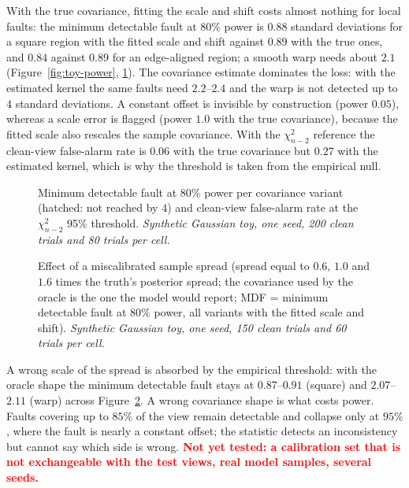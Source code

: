 With the true covariance, fitting the scale and shift costs almost nothing for local faults: the minimum detectable fault at 80\% power is $0.88$ standard
deviations for a square region with the fitted scale and shift against $0.89$ with the true ones, and $0.84$ against $0.89$ for an edge-aligned region; a smooth
warp needs about $2.1$ (Figure~\ref{fig:toy-power}, \ref{fig:toy-mdf}). The covariance estimate dominates the loss: with the estimated kernel the same faults need
$2.2$--$2.4$ and the warp is not detected up to $4$ standard deviations. A constant offset is invisible by construction (power $0.05$), whereas a scale error is
flagged (power $1.0$ with the true covariance), because the fitted scale also rescales the sample covariance. With the $\chi^2_{n-2}$ reference the clean-view
false-alarm rate is $0.06$ with the true covariance but $0.27$ with the estimated kernel, which is why the threshold is taken from the empirical null.

\begin{figure}[!t]
  \centering
  \setlength{\figw}{\linewidth}
  \caption{Minimum detectable fault at 80\% power per covariance variant (hatched: not reached by $4$) and clean-view false-alarm rate at the
  $\chi^2_{n-2}$ 95\% threshold. \emph{Synthetic Gaussian toy, one seed, 200 clean trials and 80 trials per cell.}}
  \label{fig:toy-mdf}
\end{figure}

\begin{figure}[!t]
  \centering
  \setlength{\figw}{\linewidth}
  \caption{Effect of a miscalibrated sample spread (spread equal to $0.6$, $1.0$ and $1.6$ times the truth's posterior spread; the covariance used by the
  oracle is the one the model would report; MDF = minimum detectable fault at 80\% power, all variants with the fitted scale and shift). \emph{Synthetic Gaussian toy, one seed, 150 clean trials and 60 trials per cell.}}
  \label{fig:toy-miscal}
\end{figure}

A wrong scale of the spread is absorbed by the empirical threshold: with the oracle shape the minimum detectable fault stays at $0.87$--$0.91$ (square) and
$2.07$--$2.11$ (warp) across Figure~\ref{fig:toy-miscal}. A wrong covariance shape is what costs power. Faults covering up to $85\%$ of the view remain detectable
and collapse only at $95\%$, where the fault is nearly a constant offset; the statistic detects an inconsistency but cannot say which side is wrong.
\textcolor{red}{\textbf{Not yet tested: a calibration set that is not exchangeable with the test views, real model samples, several seeds.}}


